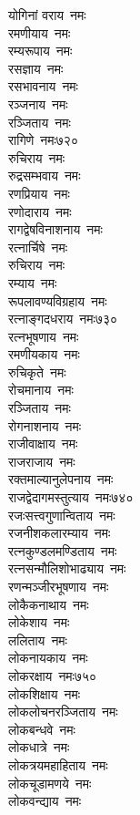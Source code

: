 \begin{multicols}{\maxColumns}
\begin{flushleft}
योगिनां वराय~नमः\\
रमणीयाय~नमः\\
रम्यरूपाय~नमः\\
रसज्ञाय~नमः\\
रसभावनाय~नमः\\
रञ्जनाय~नमः\\
रञ्जिताय~नमः\\
रागिणे~नमः\hfill ७२०\\
रुचिराय~नमः\\
रुद्रसम्भवाय~नमः\\
रणप्रियाय~नमः\\
रणोदाराय~नमः\\
रागद्वेषविनाशनाय~नमः\\
रत्नार्चिषे~नमः\\
रुचिराय~नमः\\
रम्याय~नमः\\
रूपलावण्यविग्रहाय~नमः\\
रत्नाङ्गदधराय~नमः\hfill ७३०\\
रत्नभूषणाय~नमः\\
रमणीयकाय~नमः\\
रुचिकृते~नमः\\
रोचमानाय~नमः\\
रञ्जिताय~नमः\\
रोगनाशनाय~नमः\\
राजीवाक्षाय~नमः\\
राजराजाय~नमः\\
रक्तमाल्यानुलेपनाय~नमः\\
राजद्वेदागमस्तुत्याय~नमः\hfill ७४०\\
रजःसत्त्वगुणान्विताय~नमः\\
रजनीशकलारम्याय~नमः\\
रत्नकुण्डलमण्डिताय~नमः\\
रत्नसन्मौलिशोभाढ्याय~नमः\\
रणन्मञ्जीरभूषणाय~नमः\\
लोकैकनाथाय~नमः\\
लोकेशाय~नमः\\
ललिताय~नमः\\
लोकनायकाय~नमः\\
लोकरक्षाय~नमः\hfill ७५०\\
लोकशिक्षाय~नमः\\
लोकलोचनरञ्जिताय~नमः\\
लोकबन्धवे~नमः\\
लोकधात्रे~नमः\\
लोकत्रयमहाहिताय~नमः\\
लोकचूडामणये~नमः\\
लोकवन्द्याय~नमः\\

\end{flushleft}
\end{multicols}
